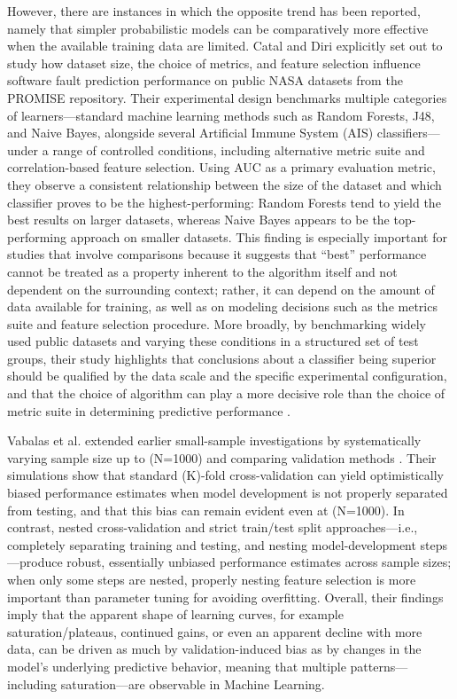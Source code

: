 \documentclass[12pt,a4paper]{article}
\begin{document}
However, there are instances in which the opposite trend has been reported, namely that simpler probabilistic models can be comparatively more effective when the available training data are limited. Catal and Diri explicitly set out to study how dataset size, the choice of metrics, and feature selection influence software fault prediction performance on public NASA datasets from the PROMISE repository. Their experimental design benchmarks multiple categories of learners—standard machine learning methods such as Random Forests, J48, and Naive Bayes, alongside several Artificial Immune System (AIS) classifiers—under a range of controlled conditions, including alternative metric suite and correlation-based feature selection. Using AUC as a primary evaluation metric, they observe a consistent relationship between the size of the dataset and which classifier proves to be the highest-performing: Random Forests tend to yield the best results on larger datasets, whereas Naive Bayes appears to be the top-performing approach on smaller datasets. This finding is especially important for studies that involve comparisons because it suggests that “best” performance cannot be treated as a property inherent to the algorithm itself and not dependent on the surrounding context; rather, it can depend on the amount of data available for training, as well as on modeling decisions such as the metrics suite and feature selection procedure. More broadly, by benchmarking widely used public datasets and varying these conditions in a structured set of test groups, their study highlights that conclusions about a classifier being superior should be qualified by the data scale and the specific experimental configuration, and that the choice of algorithm can play a more decisive role than the choice of metric suite in determining predictive performance \cite{catal2009}.

Vabalas et al. extended earlier small-sample investigations by systematically varying sample size up to (N=1000) and comparing validation methods \cite{vabalas2019}. Their simulations show that standard (K)-fold cross-validation can yield optimistically biased performance estimates when model development is not properly separated from testing, and that this bias can remain evident even at (N=1000). In contrast, nested cross-validation and strict train/test split approaches—i.e., completely separating training and testing, and nesting model-development steps—produce robust, essentially unbiased performance estimates across sample sizes; when only some steps are nested, properly nesting feature selection is more important than parameter tuning for avoiding overfitting. Overall, their findings imply that the apparent shape of learning curves, for example saturation/plateaus, continued gains, or even an apparent decline with more data, can be driven as much by validation-induced bias as by changes in the model’s underlying predictive behavior, meaning that multiple patterns—including saturation—are observable in Machine Learning.
\end{document}
